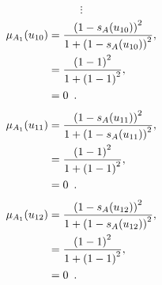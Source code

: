\documentclass[a4paper,openany]{book}
\begin{document}
				\[
					\vdots
				\]
				\begin{align}
					\mu_{A_1}(u_{10}) &= \frac{\left(1-s_A(u_{10})\right)^2}{1 + \left(1-s_A(u_{10})\right)^2} ,\\
					&= \frac{\left(1-1\right)^2}{1 + \left(1-1\right)^2} \notag ,\\
					&= 0 \enspace. \notag
				\end{align}
				\begin{align}
					\mu_{A_1}(u_{11}) &= \frac{\left(1-s_A(u_{11})\right)^2}{1 + \left(1-s_A(u_{11})\right)^2} ,\\
					&= \frac{\left(1-1\right)^2}{1 + \left(1-1\right)^2} \notag ,\\
					&= 0 \enspace. \notag
				\end{align}
				\begin{align}
					\mu_{A_1}(u_{12}) &= \frac{\left(1-s_A(u_{12})\right)^2}{1 + \left(1-s_A(u_{12})\right)^2} ,\\
					&= \frac{\left(1-1\right)^2}{1 + \left(1-1\right)^2} \notag ,\\
					&= 0 \enspace. \notag
				\end{align}
				
\end{document}
